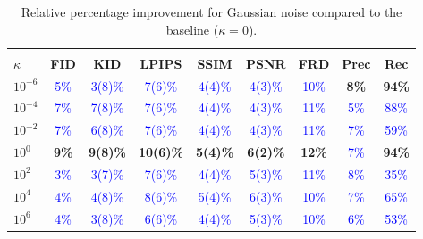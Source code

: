 \documentclass[twoside,11pt]{article}
\begin{document}
\begin{table}[ht!]
\centering
\renewcommand{\arraystretch}{1.4}
\setlength{\tabcolsep}{6pt}
\small
\begin{tabular}{lcccccccc}
\toprule
\rowcolor{gray!20}
\multicolumn{9}{c}{\textbf{Additive Gaussian Noise - Relative Improvement}} \\
\textbf{$\kappa$} & \textbf{FID} & \textbf{KID} & \textbf{LPIPS} & \textbf{SSIM} & \textbf{PSNR} & \textbf{FRD} & \textbf{Prec} & \textbf{Rec} \\
\midrule
$10^{-6}$    & \textcolor{blue}{5\%} & \textcolor{blue}{3(8)\%} & \textcolor{blue}{7(6)\%} & \textcolor{blue}{4(4)\%} & \textcolor{blue}{4(3)\%} & \textcolor{blue}{10\%} & \textbf{\textcolor{green!50!black}{8\%}} & \textbf{\textcolor{green!50!black}{94\%}} \\
$10^{-4}$    & \textcolor{blue}{7\%} & \textcolor{blue}{7(8)\%} & \textcolor{blue}{7(6)\%} & \textcolor{blue}{4(4)\%} & \textcolor{blue}{4(3)\%} & \textcolor{blue}{11\%} & \textcolor{blue}{5\%} & \textcolor{blue}{88\%} \\
$10^{-2}$    & \textcolor{blue}{7\%} & \textcolor{blue}{6(8)\%} & \textcolor{blue}{7(6)\%} & \textcolor{blue}{4(4)\%} & \textcolor{blue}{4(3)\%} & \textcolor{blue}{11\%} & \textcolor{blue}{7\%} & \textcolor{blue}{59\%} \\
$10^{0}$     & \textbf{\textcolor{green!50!black}{9\%}} & \textbf{\textcolor{green!50!black}{9(8)\%}} & \textbf{\textcolor{green!50!black}{10(6)\%}} & \textbf{\textcolor{green!50!black}{5(4)\%}} & \textbf{\textcolor{green!50!black}{6(2)\%}} & \textbf{\textcolor{green!50!black}{12\%}} & \textcolor{blue}{7\%} & \textbf{\textcolor{green!50!black}{94\%}} \\
$10^{2}$     & \textcolor{blue}{3\%} & \textcolor{blue}{3(7)\%} & \textcolor{blue}{7(6)\%} & \textcolor{blue}{4(4)\%} & \textcolor{blue}{5(3)\%} & \textcolor{blue}{11\%} & \textcolor{blue}{8\%} & \textcolor{blue}{35\%} \\
$10^{4}$     & \textcolor{blue}{4\%} & \textcolor{blue}{4(8)\%} & \textcolor{blue}{8(6)\%} & \textcolor{blue}{5(4)\%} & \textcolor{blue}{6(3)\%} & \textcolor{blue}{10\%} & \textcolor{blue}{7\%} & \textcolor{blue}{65\%} \\
$10^{6}$     & \textcolor{blue}{4\%} & \textcolor{blue}{3(8)\%} & \textcolor{blue}{6(6)\%} & \textcolor{blue}{4(4)\%} & \textcolor{blue}{5(3)\%} & \textcolor{blue}{10\%} & \textcolor{blue}{6\%} & \textcolor{blue}{53\%} \\
\bottomrule
\end{tabular}
\caption{Relative percentage improvement for Gaussian noise compared to the baseline ($\kappa = 0$).}
\label{tab:robustness_gaussian_rel}
\end{table}
\end{document}
